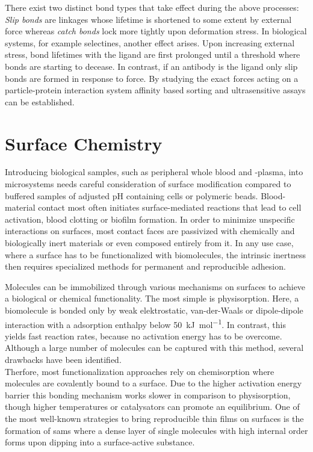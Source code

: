 There exist two distinct bond types that take effect during the above processes: \textit{Slip bonds} are linkages whose lifetime is shortened to some extent by external force whereas \textit{catch bonds} lock more tightly upon deformation stress. In biological systems, for example selectines, another effect arises. Upon increasing external stress, bond lifetimes with the ligand are first prolonged until a threshold where bonds are starting to decease.  In contrast, if an antibody is the ligand only slip bonds are formed in response to force.\cite{lit:bio:slip_bonds, lit:bio:catch_bonds} By studying the exact forces acting on a particle-protein interaction system affinity based sorting and ultrasensitive assays can be established.\cite{lit:bio:attomolarDetection}

\clearpage
\section{Surface Chemistry}
Introducing biological samples, such as peripheral whole blood and -plasma, into microsystems needs careful consideration of surface modification compared to buffered samples of adjusted pH containing cells or polymeric beads. Blood-material contact most often initiates surface-mediated reactions that lead to cell activation, blood clotting or biofilm formation.\cite{lit:bio:biomaterialInterfaces,lit:surf:microchannelEffectBlood} In order to minimize unspecific interactions on surfaces, most contact faces are passivized with chemically and biologically inert materials or even composed entirely from it. In any use case, where a surface has to be functionalized with biomolecules, the intrinsic inertness then requires specialized methods for permanent and reproducible adhesion.\cite{lit:chem:surface:methods,lit:surf:optimizedAdsorption}

Molecules can be immobilized through various mechanisms on surfaces to achieve a biological or chemical functionality. The most simple is physisorption. Here, a biomolecule is bonded only by weak elektrostatic, van-der-Waals or dipole-dipole interaction with a adsorption enthalpy below \SI{50}{\kilo\joule\per\mole}.\cite{lit:surf:optimizedAdsorption} In contrast, this yields fast reaction rates, because no activation energy has to be overcome. Although a large number of molecules can be captured with this method, several drawbacks have been identified.\cite{lit:bio:ImmobilizationTechniques, lit:bio:immobilization:UV-ABs,lit:bio:physisorp:desorption, lit:chem:surfModOptics} \\
Therfore, most functionalization approaches rely on chemisorption where molecules are covalently bound to a surface. Due to the higher activation energy barrier this bonding mechanism works slower in comparison to physisorption, though higher temperatures or catalysators can promote an equilibrium. One of the most well-known strategies to bring reproducible thin films on surfaces is the formation of \glspl{sam} where a dense layer of single molecules with high internal order forms upon dipping into a surface-active substance.\cite{lit:chem:sin:langeDiss}

